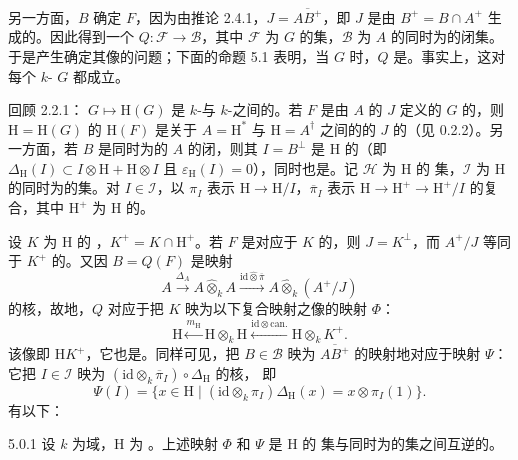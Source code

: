 另一方面，$B$ 确定 $F$，因为由推论 2.4.1，$J=\overline{AB^+}$，即 $J$ 是由 $B^+=B\cap A^+$ 生成的。因此得到一个 $Q:\mathcal F\to\mathcal B$，其中 $\mathcal F$ 为 $G$ 的集，$\mathcal B$ 为 $A$ 的同时为的闭集。于是产生确定其像的问题；下面的命题 5.1 表明，当 $G$ 时，$Q$ 是。事实上，这对每个 $k$- $G$ 都成立。

回顾 2.2.1： $G\mapsto\mathrm H(G)$ 是 $k$-与 $k$-之间的。若 $F$ 是由 $A$ 的 $J$ 定义的 $G$ 的，则 $\mathrm H=\mathrm H(G)$ 的  $\mathrm H(F)$ 是关于 $A=\mathrm H^*$ 与 $\mathrm H=A^\dagger$ 之间的的 $J$ 的（见 0.2.2）。另一方面，若 $B$ 是同时为的 $A$ 的闭，则其 $I=B^\perp$ 是 $\mathrm H$ 的（即 $\Delta_{\mathrm H}(I)\subset I\otimes\mathrm H+\mathrm H\otimes I$ 且 $\varepsilon_{\mathrm H}(I)=0$），同时也是。记 $\mathcal H$ 为 $\mathrm H$ 的 集，$\mathcal I$ 为 $\mathrm H$ 的同时为的集。对 $I\in\mathcal I$，以 $\pi_I$ 表示 $\mathrm H\to\mathrm H/I$，$\overline\pi_I$ 表示 $\mathrm H\to\mathrm H^+\to\mathrm H^+/I$ 的复合，其中 $\mathrm H^+$ 为 $\mathrm H$ 的。

设 $K$ 为 $\mathrm H$ 的 ，$K^+=K\cap\mathrm H^+$。若 $F$ 是对应于 $K$ 的，则 $J=K^\perp$，而 $A^+/J$ 等同于 $K^+$ 的。又因 $B=Q(F)$ 是映射
\[
A\xrightarrow{\Delta_A}A\widehat\otimes_k A
\xrightarrow{\mathrm{id}\widehat\otimes\overline\pi}A\widehat\otimes_k(A^+/J)
\]
的核，故地，$Q$ 对应于把 $K$ 映为以下复合映射之像的映射 $\Phi$：
\[
\mathrm H\xleftarrow{m_{\mathrm H}}\mathrm H\otimes_k\mathrm H
\xleftarrow{\mathrm{id}\otimes\mathrm{can}.}\mathrm H\otimes_k K^+.
\]
该像即 $\mathrm HK^+$，它也是。同样可见，把 $B\in\mathcal B$ 映为 $\overline{AB^+}$ 的映射地对应于映射 $\Psi$：它把 $I\in\mathcal I$ 映为 $(\mathrm{id}\otimes_k\overline\pi_I)\circ\Delta_{\mathrm H}$ 的核，
即
\[
\Psi(I)=\{x\in\mathrm H\mid(\mathrm{id}\otimes_k\pi_I)\Delta_{\mathrm H}(x)=x\otimes\pi_I(1)\}.
\]
有以下：
\begin{SGAresult}{}{5.0.1}
设 $k$ 为域，$\mathrm H$ 为 。上述映射 $\Phi$ 和 $\Psi$ 是 $\mathrm H$ 的 集与同时为的集之间互逆的。
\end{SGAresult}

